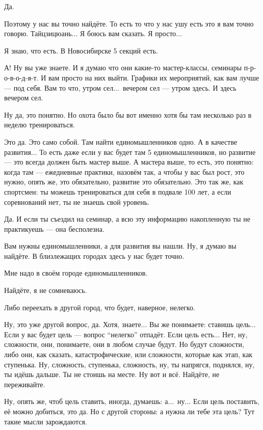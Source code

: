\I
Да.

\A
Поэтому у нас вы точно найдёте.
То есть то что у нас ушу есть
это я вам точно говорю.
Тайцзицюань... Я боюсь вам сказать.
Я просто...

\I
Я знаю, что есть.
В Новосибирске 5 секций есть.

\A
А! Ну вы уже знаете.
И я думаю что они какие-то мастер-классы, семинары \hbox{п-р-о-в-о-д-я-т}.
И вам просто на них выйти.
Графики их мероприятий, как вам лучше --- под себя.
Вам то что, утром сел...\ вечером сел --- утром здесь.
И здесь вечером сел.

\I
Ну да, это понятно.
Но охота было бы вот именно хотя бы там несколько раз в неделю тренироваться.

\A
Это да. Это само собой.
Там найти единомышленников одно.
А в качестве развития...
То есть даже если у вас будет там 5 единомышленников,
но развитие --- это всегда должен быть мастер выше.
А мастера выше, то есть, это понятно:
когда там --- ежедневные практики, назовём так, а чтобы у вас был рост, это нужно,
опять же, это обязательно, развитие это обязательно. Это так же, как спортсмен: ты можешь
тренироваться для себя в подвале 100 лет, а если соревнований нет, ты не знаешь свой уровень.

\I
Да. И если ты съездил на семинар, а всю эту информацию накопленную ты не практикуешь
--- она бесполезна.

\A
Вам нужны единомышленники, а для развития вы нашли.
Ну, я думаю вы найдёте. В близлежащих городах здесь у нас будет точно.

\I
Мне надо в своём городе единомышленников.

\A
Найдёте, я не сомневаюсь.

\I
Либо переехать в другой город,
что будет, наверное, нелегко.

\A
Ну, это уже другой вопрос, да.
Хотя, знаете...
Вы же понимаете: ставишь цель...
Если у вас будет цель --- вопрос ``нелегко'' отпадёт.
Если цель есть... Нет, ну, сложности,
они, понимаете, они в любом случае будут.
Но будут сложности, либо они, как сказать, катастрофические, или сложности, которые
как этап, как ступенька.
Ну, сложность, ступенька, сложность, ну, ты напрягся, поднялся, ну, ты идёшь дальше.
Ты не стоишь на месте.
Ну вот и всё. Найдёте, не переживайте.

\I
Ну, опять же, чтоб цель ставить, иногда, думаешь: а...\ ну... 
Если цель поставить, её можно добиться, это да.
Но с другой стороны: а нужна ли тебе эта цель?
Тут такие мысли зарождаются.

